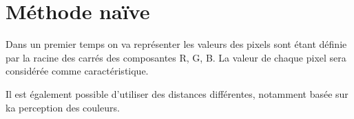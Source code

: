 \chapter{Méthode naïve}

Dans un premier temps on va représenter les valeurs des pixels sont étant définie par la racine des carrés des composantes R, G, B. La valeur de chaque pixel sera considérée comme caractéristique.

Il est également possible d'utiliser des distances différentes, notamment basée sur ka perception des couleurs.